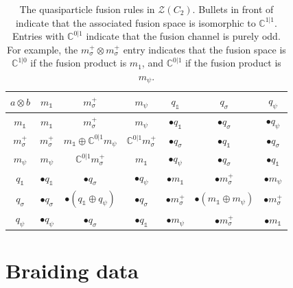 \documentclass[12pt,a4paper]{article}
\newcommand{\tp}{\otimes}
\newcommand{\unit}{\mathds{1}}
\newcommand{\cc}{\mathbb{C}}
\newcommand{\mcz}{\mathcal{Z}}
\begin{document}
\begin{table}
\centering
\begin{tabular}{c||c|c|c||c|c|c}
$ {a\otimes b} $&$m_\unit $&$m_\sigma^+$&$m_\psi$&$q_\unit$&$q_\sigma$&$q_\psi $\\
     \hline
     \hline
     
$m_\unit $&$m_\unit$&$ m_\sigma^+$&$m_\psi$&    $\bullet q_\unit$&$\bullet q_\sigma$&$\bullet q_\psi$ \\

     \hline
$m_\sigma^+ $&$m_\sigma^+$&$m_\unit \oplus \cc^{0|1}m_\psi $&$ \cc^{0|1} m_\sigma^+ $&$      \bullet q_\sigma $&$ \bullet q_\unit$&$ \bullet q_\sigma$ \\

     \hline
     
$m_\psi $&$m_\psi$&$\cc^{0|1} m_\sigma^+$&$m_\unit$&      $\bullet q_\psi$&$\bullet q_\sigma$&$\bullet q_\unit $\\

     \hline
     \hline
     
$q_\unit $&$\bullet q_\unit$&$\bullet q_\sigma $&$\bullet q_\psi$&$\bullet m_\unit$&$\bullet m_\sigma^+$&$\bullet m_\psi$\\

\hline
$q_\sigma$&$\bullet q_\sigma$&$\bullet (q_\unit \oplus q_\psi)$&$\bullet q_\sigma$&$\bullet m_\sigma^+$&$\bullet (m_\unit \oplus m_\psi)$&$\bullet m_\sigma^+$ \\


\hline
$q_\psi $&$\bullet q_\psi$&$\bullet q_\sigma$&$\bullet q_\unit$&$\bullet m_\psi$&$\bullet m_\sigma^+$&$\bullet m_\unit$
\end{tabular}
\caption{ \label{fusiontable} The quasiparticle fusion rules in $\mcz(C_2)$. Bullets in front of indicate that the associated fusion space is isomorphic to $\cc^{1|1}$. Entries with $\cc^{0|1}$ indicate that the fusion channel is purely odd. For example, the $m_\sigma^+ \tp m_\sigma^+$ entry indicates that the fusion space is $\cc^{1|0}$ if the fusion product is $m_1$, and $\cc^{0|1}$ if the fusion product is $m_\psi$. }
\end{table}




\section{Braiding data} \label{braiding}
\end{document}
